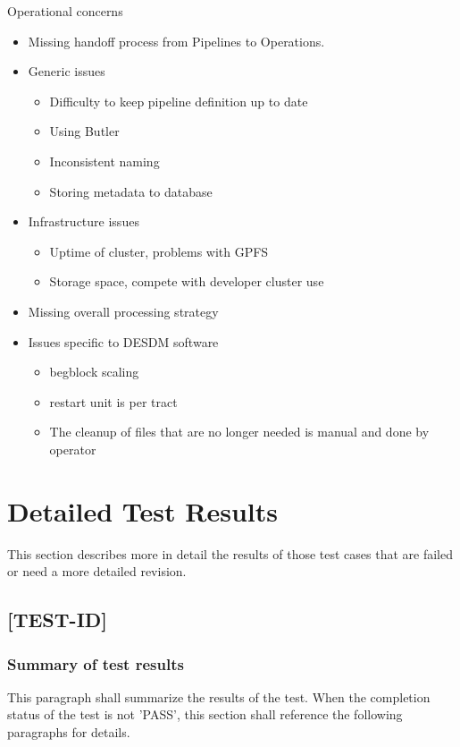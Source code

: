\documentclass[DM,lsstdraft,STR,toc]{lsstdoc}
\begin{document}
Operational concerns
\begin{itemize}
  \item Missing handoff process from Pipelines to Operations.
  \item Generic issues
  \begin{itemize}
    \item Difficulty to keep pipeline definition up to date
    \item Using Butler
    \item Inconsistent naming
    \item Storing metadata to database
  \end{itemize}
  \item Infrastructure issues
  \begin{itemize}
    \item Uptime of cluster, problems with GPFS
    \item Storage space, compete with developer cluster use
  \end{itemize}
  \item Missing overall processing strategy
  \item Issues specific to DESDM software
  \begin{itemize}
    \item begblock scaling
    \item restart unit is per tract
    \item The cleanup of files that are no longer needed is manual and done by operator
  \end{itemize}
\end{itemize}

\newpage

\section{Detailed Test Results \label{sect:detailed}}
This section describes more in detail the results of those test cases that are failed or need a more detailed revision.
\subsection{[TEST-ID]}
\subsubsection{Summary of test results}
This paragraph shall summarize the results of the test. When the completion status of the test is not 'PASS', this section
shall reference the following paragraphs for details.
\end{document}
